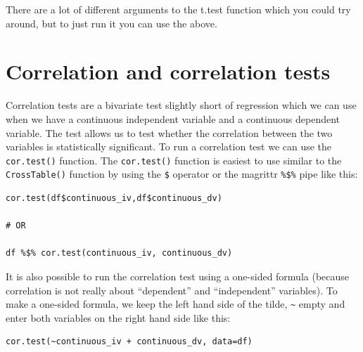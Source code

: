 \documentclass[
]{book}
\begin{document}
There are a lot of different arguments to the t.test function which you could try around, but to just run it you can use the above.

\hypertarget{correlation-and-correlation-tests}{%
\section{Correlation and correlation tests}\label{correlation-and-correlation-tests}}

Correlation tests are a bivariate test slightly short of regression which we can use when we have a continuous independent variable and a continuous dependent variable. The test allows us to test whether the correlation between the two variables is statistically significant. To run a correlation test we can use the \texttt{cor.test()} function. The \texttt{cor.test()} function is easiest to use similar to the \texttt{CrossTable()} function by using the \texttt{\$} operator or the magrittr \texttt{\%\$\%} pipe like this:

\begin{verbatim}
cor.test(df$continuous_iv,df$continuous_dv)

# OR

df %$% cor.test(continuous_iv, continuous_dv)
\end{verbatim}

It is also possible to run the correlation test using a one-sided formula (because correlation is not really about ``dependent'' and ``independent'' variables). To make a one-sided formula, we keep the left hand side of the tilde, \texttt{\textasciitilde{}} empty and enter both variables on the right hand side like this:

\begin{verbatim}
cor.test(~continuous_iv + continuous_dv, data=df)
\end{verbatim}
\end{document}

